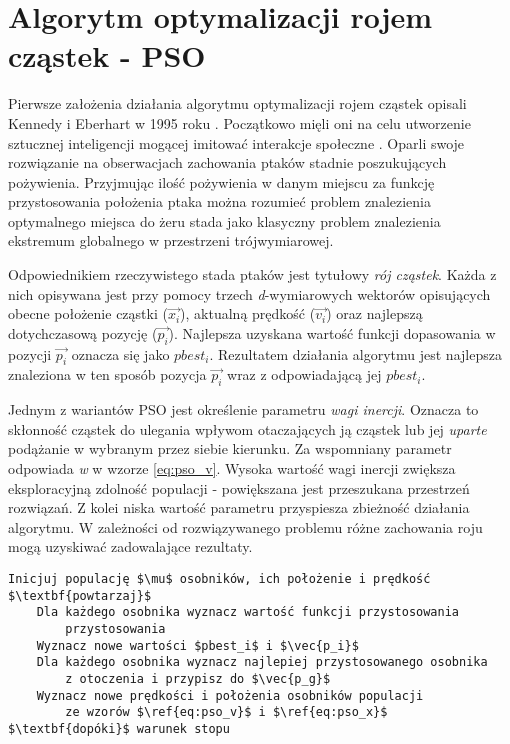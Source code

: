 \section{Algorytm optymalizacji rojem cząstek - PSO}
\label{sec:pso}
\par
Pierwsze założenia działania algorytmu optymalizacji rojem cząstek opisali Kennedy i Eberhart w 1995 roku \cite{kennedy1995pso}. Początkowo mięli oni na celu utworzenie sztucznej inteligencji mogącej imitować interakcje społeczne \cite{poli2007particle}. Oparli swoje rozwiązanie na obserwacjach zachowania ptaków stadnie poszukujących pożywienia. Przyjmując ilość pożywienia w danym miejscu za funkcję przystosowania położenia ptaka można rozumieć problem znalezienia optymalnego miejsca do żeru stada jako klasyczny problem znalezienia ekstremum globalnego w przestrzeni trójwymiarowej.
\par
Odpowiednikiem rzeczywistego stada ptaków jest tytułowy \emph{rój cząstek}. Każda z nich opisywana jest przy pomocy trzech \emph{d}-wymiarowych wektorów opisujących obecne położenie cząstki ($\vec{x_i}$), aktualną prędkość ($\vec{v_i}$) oraz najlepszą dotychczasową pozycję ($\vec{p_i}$). Najlepsza uzyskana wartość funkcji dopasowania w pozycji $\vec{p_i}$ oznacza się jako $pbest_i$. Rezultatem działania algorytmu jest najlepsza znaleziona w ten sposób pozycja $\vec{p_i}$ wraz z odpowiadającą jej $pbest_i$.
\par
Jednym z wariantów PSO jest określenie parametru \emph{wagi inercji}. Oznacza to skłonność cząstek do ulegania wpływom otaczających ją cząstek lub jej \emph{uparte} podążanie w wybranym przez siebie kierunku. Za wspomniany parametr odpowiada \emph{w} w wzorze \ref{eq:pso_v}. Wysoka wartość wagi inercji zwiększa eksploracyjną zdolność populacji - powiększana jest przeszukana przestrzeń rozwiązań. Z kolei niska wartość parametru przyspiesza zbieżność działania algorytmu. W zależności od rozwiązywanego problemu różne zachowania roju mogą uzyskiwać zadowalające rezultaty.
\begin{lstlisting}[caption=Schemat algorytmu optymalizacji rojem cząstek - \textbf{PSO}, label=lst:pso_pseudocode, mathescape, breaklines=true]
Inicjuj populację $\mu$ osobników, ich położenie i prędkość
$\textbf{powtarzaj}$
    Dla każdego osobnika wyznacz wartość funkcji przystosowania 
        przystosowania 
    Wyznacz nowe wartości $pbest_i$ i $\vec{p_i}$
    Dla każdego osobnika wyznacz najlepiej przystosowanego osobnika 
        z otoczenia i przypisz do $\vec{p_g}$
    Wyznacz nowe prędkości i położenia osobników populacji
        ze wzorów $\ref{eq:pso_v}$ i $\ref{eq:pso_x}$
$\textbf{dopóki}$ warunek stopu
\end{lstlisting}

